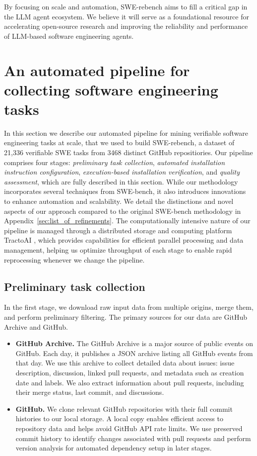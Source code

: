 \documentclass[dandb]{article}
\begin{document}
By focusing on scale and automation, SWE-rebench aims to fill a critical gap in the LLM agent ecosystem. We believe it will serve as a foundational resource for accelerating open-source research and improving the reliability and performance of LLM-based software engineering agents.

\section{An automated pipeline for collecting software engineering tasks}
\label{sec:automated_pipeline}

In this section we describe our automated pipeline for mining verifiable software engineering tasks at scale, that we used to build SWE-rebench, a dataset of 21,336 verifiable SWE tasks from 3468 distinct GitHub repositiories. Our pipeline comprises four stages: \textit{preliminary task collection}, \textit{automated installation instruction configuration}, \textit{execution-based installation verification}, and \textit{quality assessment}, which are fully described in this section. While our methodology incorporates several techniques from SWE-bench, it also introduces innovations to enhance automation and scalability. We detail the distinctions and novel aspects of our approach compared to the original SWE-bench methodology in Appendix~\ref{sec:list_of_refinements}. The computationally intensive nature of our pipeline is managed through a distributed storage and computing platform TractoAI \citep{tractoai2025}, which provides capabilities for efficient parallel processing and data management, helping us optimize throughput of each stage to enable rapid reprocessing whenever we change the pipeline.

\subsection{Preliminary task collection}
\label{sec:prelim_task_collection}

In the first stage, we download raw input data from multiple origins, merge them, and perform preliminary filtering. The primary sources for our data are GitHub Archive \citep{grigorik2011gharchive} and GitHub.


\begin{itemize}
    \item \textbf{GitHub Archive.} The GitHub Archive is a major source of public events on GitHub. Each day, it publishes a JSON archive listing all GitHub events from that day. We use this archive to collect detailed data about issues: issue description, discussion, linked pull requests, and metadata such as creation date and labels. We also extract information about pull requests, including their merge status, last commit, and discussions.
    \item \textbf{GitHub.} We clone relevant GitHub repositories with their full commit histories to our local storage. A local copy enables efficient access to repository data and helps avoid GitHub API rate limits. We use preserved commit history to identify changes associated with pull requests and perform version analysis for automated dependency setup in later stages.
\end{itemize}
\end{document}
